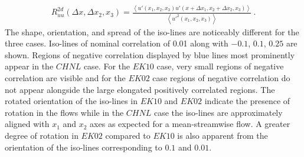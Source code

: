 \documentclass{svjour3}                     %
\begin{document}
\begin{align}
 R_{uu}^{2d}(\Delta x, \Delta x_2, x_3)=\frac{\left < u'(x_1, x_2, x_3)u'(x+ \Delta x_1, x_2 + \Delta x_2, x_3) \right >}{\left < u'^{2}(x_1,x_2,x_3)\right >} \ .
 \label{eqn:2d_corr}
\end{align}
The shape, orientation, and spread of the iso-lines are noticeably different for the three cases. Iso-lines of nominal correlation of 0.01 along with $-0.1$, $0.1$, $0.25$ are shown. Regions of negative correlation displayed by blue lines most prominently appear in  the $CHNL$ case. For the $EK10$ case, very small regions of negative correlation are visible and for the $EK02$ case regions of negative correlation do not appear alongside the large elongated positively correlated regions. The rotated orientation of the iso-lines in $EK10$ and $EK02$ indicate  the presence of rotation in the flows while in the $CHNL$ case the iso-lines are approximately aligned with $x_1$ and $x_2$ axes as expected for a mean-streamwise flow. A greater degree of rotation in $EK02$ compared to $EK10$ is also apparent from the orientation of the iso-lines corresponding to $0.1$ and $0.01$.  
\graphicspath{{chap1Img/}}
\end{document}
